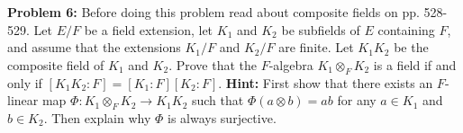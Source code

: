 \documentclass[12pt]{article}
\begin{document}
{\bf Problem 6:} Before doing this problem read about composite fields on pp. 528-529.
Let $E/F$ be a field extension, let $K_1$ and $K_2$ be subfields of $E$ containing $F$,
and assume that the extensions $K_1/F$ and $K_2/F$ are finite. Let $K_1 K_2$ be the composite
field of $K_1$ and $K_2$. Prove that the $F$-algebra $K_1\otimes_F K_2$ is a field if and only if
$[K_1 K_2: F]=[K_1: F][K_2: F]$. {\bf Hint:} First show that there exists an $F$-linear map
$\Phi: K_1\otimes_F K_2\to K_1 K_2$ such that $\Phi(a\otimes b)=ab$ for any $a\in K_1$ and $b\in K_2$.
Then explain why $\Phi$ is always surjective.
\end{document}
